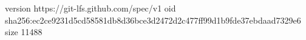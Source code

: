 version https://git-lfs.github.com/spec/v1
oid sha256:ec2ce9231d5cd58581db8d36bce3d2472d2c477ff99d1b9fde37ebdaad7329e6
size 11488
